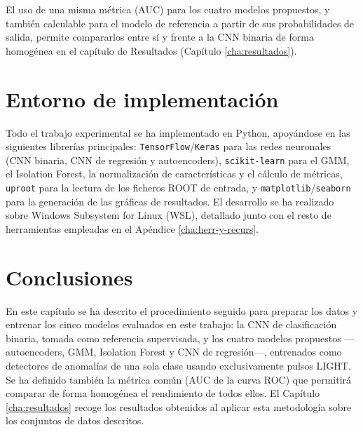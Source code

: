 El uso de una misma métrica (AUC) para los cuatro modelos propuestos, y también calculable para el modelo de referencia a partir de sus probabilidades de salida, permite compararlos entre sí y frente a la CNN binaria de forma homogénea en el capítulo de Resultados (Capítulo \ref{cha:resultados}).


\section{Entorno de implementación}
\label{sec:entorno-implementacion}

Todo el trabajo experimental se ha implementado en Python, apoyándose en las siguientes librerías principales: \texttt{TensorFlow}/\texttt{Keras} para las redes neuronales (CNN binaria, CNN de regresión y autoencoders), \texttt{scikit-learn} para el GMM, el Isolation Forest, la normalización de características y el cálculo de métricas, \texttt{uproot} para la lectura de los ficheros ROOT de entrada, y \texttt{matplotlib}/\texttt{seaborn} para la generación de las gráficas de resultados. El desarrollo se ha realizado sobre Windows Subsystem for Linux (WSL), detallado junto con el resto de herramientas empleadas en el Apéndice \ref{cha:herr-y-recurs}.


\section{Conclusiones}
\label{sec:conclusiones-desarrollo}

En este capítulo se ha descrito el procedimiento seguido para preparar los datos y entrenar los cinco modelos evaluados en este trabajo: la CNN de clasificación binaria, tomada como referencia supervisada, y los cuatro modelos propuestos —autoencoders, GMM, Isolation Forest y CNN de regresión—, entrenados como detectores de anomalías de una sola clase usando exclusivamente pulsos LIGHT. Se ha definido también la métrica común (AUC de la curva ROC) que permitirá comparar de forma homogénea el rendimiento de todos ellos. El Capítulo \ref{cha:resultados} recoge los resultados obtenidos al aplicar esta metodología sobre los conjuntos de datos descritos.


